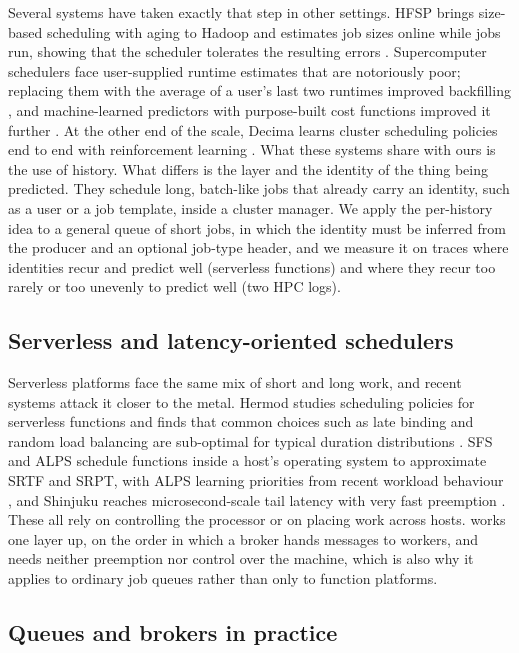 Several systems have taken exactly that step in other settings. HFSP brings size-based scheduling with aging to Hadoop and estimates job sizes online while jobs run, showing that the scheduler tolerates the resulting errors \citep{pastorelli2013}. Supercomputer schedulers face user-supplied runtime estimates that are notoriously poor; replacing them with the average of a user's last two runtimes improved backfilling
\citep{tsafrir2007}, and machine-learned predictors with purpose-built cost functions improved it further \citep{gaussier2015}. At the other end of the scale, Decima learns cluster scheduling policies end to end with reinforcement learning \citep{mao2019decima}. What these systems share with ours is the use of history. What differs is the layer and the identity of the thing being predicted. They schedule long, batch-like jobs that already carry an identity, such as a user or a
job template, inside a cluster manager. We apply the per-history idea to a general queue of short jobs, in which the identity must be inferred from the producer and an optional job-type header, and we measure it on traces where identities recur and predict well (serverless functions) and where they recur too rarely or too unevenly to predict well (two HPC logs).

\subsection{Serverless and latency-oriented schedulers}\label{sec:rw-serverless}

Serverless platforms face the same mix of short and long work, and recent systems attack it closer to the metal. Hermod studies scheduling policies for serverless functions and finds that common choices such as late binding and random load balancing are sub-optimal for typical duration distributions \citep{kaffes2022hermod}. SFS and ALPS schedule functions inside a host's operating system to approximate SRTF
and SRPT, with ALPS learning priorities from recent workload behaviour \citep{fu2022sfs,fu2024alps}, and Shinjuku reaches microsecond-scale tail latency with very fast preemption \citep{kaffes2019shinjuku}. These all rely on controlling the processor or on placing work across hosts. \sys{} works one layer up, on the order in which a broker hands messages to workers, and needs neither preemption nor control over the machine, which is also why it applies to ordinary job queues
rather than only to function platforms.

\subsection{Queues and brokers in practice}\label{sec:rw-brokers}

